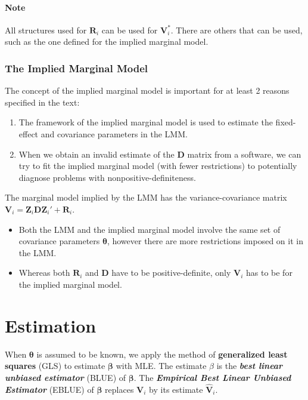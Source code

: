 \documentclass[english]{article}
\begin{document}
\begin{multicols*}{2}
\paragraph{Note}	All structures used for $\bm{R}_{i}$ can be used for $\bm{V}_{i}^{*}$. There are others that can be used, such as the one defined for the implied marginal model. 


\subsubsection{The Implied Marginal Model}
\begin{rappel_enhanced}[Context]
The concept of the implied marginal model is important for at least 2 reasons specified in the text:
\begin{enumerate}
	\item	The framework of the implied marginal model is used to estimate the fixed-effect and covariance parameters in the LMM.
	\item	When we obtain an invalid estimate of the $\bm{D}$ matrix from a software, we can try to fit the implied marginal model (with fewer restrictions) to potentially diagnose problems with nonpositive-definiteness.
\end{enumerate}
\end{rappel_enhanced}

The marginal model implied by the LMM has the variance-covariance matrix $\bm{V}_{i} = \bm{Z}_{i}\bm{D}\bm{Z}_{i}' + \bm{R}_{i}$. 
\begin{itemize}
	\item	Both the LMM and the implied marginal model involve the same set of covariance parameters $\bm{\theta}$, however there are more restrictions imposed on it in the LMM.
	\item	Whereas both $\bm{R}_{i}$ and $\bm{D}$ have to be positive-definite, only $\bm{V}_{i}$ has to be for the implied marginal model.
\end{itemize}

\section{Estimation}
When $\bm{\theta}$ is assumed to be known, we apply the method of \textbf{generalized least squares} (GLS) to estimate $\bm{\beta}$ with MLE. The estimate $\hat{\beta}$ is the \textit{\textbf{best linear unbiased estimator}} (BLUE) of $\bm{\beta}$. The \textbf{\textit{Empirical Best Linear Unbiased Estimator}} (EBLUE) of $\bm{\beta}$ replaces $\bm{V}_{i}$ by its estimate $\hat{\bm{V}}_{i}$.


\end{multicols*}
\end{document}
